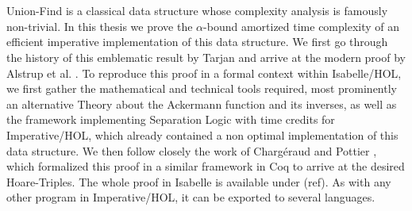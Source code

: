 \chapter{\abstractname}

Union-Find is a classical data structure whose complexity analysis is famously non-trivial. In this thesis we prove the $\alpha$-bound amortized time complexity of an efficient imperative implementation of this data structure. We first go through the history of this emblematic result by Tarjan \cite{Tarjan1975b} and arrive at the modern proof by Alstrup et al. \cite{Alstrup14}.
To reproduce this proof in a formal context within Isabelle/HOL, we first gather the mathematical and technical tools required, most prominently an alternative Theory about the Ackermann function and its inverses, as well as the framework implementing Separation Logic with time credits for Imperative/HOL, which already contained a non optimal implementation of this data structure.
We then follow closely the work of Chargéraud and Pottier \cite{chargueraud17}, which formalized this proof in a similar framework in Coq to arrive at the desired Hoare-Triples. The whole proof in Isabelle is available under (ref). As with any other program in Imperative/HOL, it can be exported to several languages.


